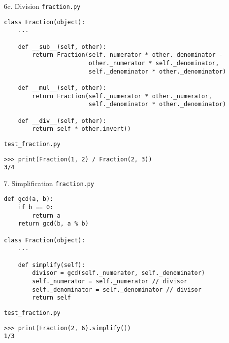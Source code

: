 \documentclass{beamer}
\begin{document}
\begin{frame}[fragile]{6c. Division}
\small
\texttt{fraction.py}
\begin{verbatim}
class Fraction(object):
    ...

    def __sub__(self, other):
        return Fraction(self._numerator * other._denominator -
                        other._numerator * self._denominator,
                        self._denominator * other._denominator)

    def __mul__(self, other):
        return Fraction(self._numerator * other._numerator,
                        self._denominator * other._denominator)

    def __div__(self, other):
        return self * other.invert()
\end{verbatim}

\vfill

\texttt{test\_fraction.py}
\begin{verbatim}
>>> print(Fraction(1, 2) / Fraction(2, 3))
3/4
\end{verbatim}
\end{frame}

\begin{frame}[fragile]{7. Simplification}
\small
\texttt{fraction.py}
\begin{verbatim}
def gcd(a, b):
    if b == 0:
        return a
    return gcd(b, a % b)

class Fraction(object):
    ...

    def simplify(self):
        divisor = gcd(self._numerator, self._denominator)
        self._numerator = self._numerator // divisor
        self._denominator = self._denominator // divisor
        return self
\end{verbatim}

\vfill

\texttt{test\_fraction.py}
\begin{verbatim}
>>> print(Fraction(2, 6).simplify())
1/3
\end{verbatim}
\end{frame}
\end{document}
